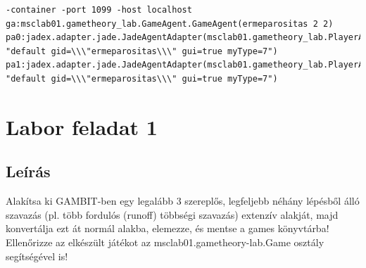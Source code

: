\begin{lstlisting}[caption=érmepárosítás run config, frame=single,float=!ht]
-container -port 1099 -host localhost 
ga:msclab01.gametheory_lab.GameAgent.GameAgent(ermeparositas 2 2) pa0:jadex.adapter.jade.JadeAgentAdapter(msclab01.gametheory_lab.PlayerAgent.Player 
"default gid=\\\"ermeparositas\\\" gui=true myType=7") 
pa1:jadex.adapter.jade.JadeAgentAdapter(msclab01.gametheory_lab.PlayerAgent.Player 
"default gid=\\\"ermeparositas\\\" gui=true myType=7")
\end{lstlisting}
		



\section{Labor feladat 1}
\subsection{Leírás}
Alakítsa ki GAMBIT-ben egy legalább 3 szereplős, legfeljebb néhány lépésből álló szavazás (pl. több fordulós (runoff) többségi szavazás) extenzív alakját, majd konvertálja ezt át normál alakba, elemezze, és mentse a games könyvtárba! Ellenőrizze az elkészült játékot az msclab01.gametheory-lab.Game osztály segítségével is! 
